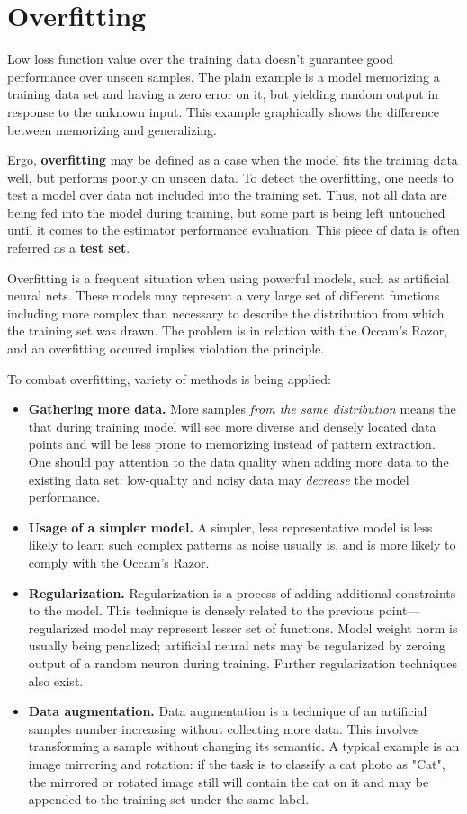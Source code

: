 \documentclass[thesis=B,english]{FITthesis}[2019/12/23]
\begin{document}
\section{Overfitting}

Low loss function value over the training data doesn't guarantee good performance over unseen samples. The plain example is a model memorizing a training data set and having a zero error on it, but yielding random output in response to the unknown input. This example graphically shows the difference between memorizing and generalizing.

Ergo, \textbf{overfitting} may be defined as a case when the model fits the training data well, but performs poorly on unseen data. To detect the overfitting, one needs to test a model over data not included into the training set. Thus, not all data are being fed into the model during training, but some part is being left untouched until it comes to the estimator performance evaluation. This piece of data is often referred as a \textbf{test set}.

Overfitting is a frequent situation when using powerful models, such as artificial neural nets. These models may represent a very large set of different functions including more complex than necessary to describe the distribution from which the training set was drawn. The problem is in relation with the Occam's Razor, and an overfitting occured implies violation the principle\cite{overfitting}.

To combat overfitting, variety of methods is being applied:
\begin{itemize}
	\item \textbf{Gathering more data.} More samples \textit{from the same distribution} means the that during training model will see more diverse and densely located data points and will be less prone to memorizing instead of pattern extraction. One should pay attention to the data quality when adding more data to the existing data set: low-quality and noisy data may \textit{decrease} the model performance.
	\item \textbf{Usage of a simpler model.} A simpler, less representative model is less likely to learn such complex patterns as noise usually is, and is more likely to comply with the Occam's Razor.
	\item \textbf{Regularization.} Regularization is a process of adding additional constraints to the model. This technique is densely related to the previous point---regularized model may represent lesser set of functions. Model weight norm is usually being penalized; artificial neural nets may be regularized by zeroing output of a random neuron during training. Further regularization techniques also exist.
	\item \textbf{Data augmentation.} Data augmentation is a technique of an artificial samples number increasing without collecting more data. This involves transforming a sample without changing its semantic. A typical example is an image mirroring and rotation: if the task is to classify a cat photo as "Cat", the mirrored or rotated image still will contain the cat on it and may be appended to the training set under the same label.
\end{itemize}
\end{document}
